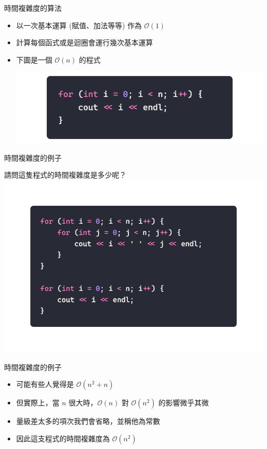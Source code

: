 \documentclass[aspectratio=169]{beamer}
\begin{document}
	\begin{frame}{時間複雜度的算法}
		\begin{itemize}
			\item<1-> 以一次基本運算 (賦值、加法等等) 作為 $\mathcal{O}(1)$
			\item<2-> 計算每個函式或是迴圈會運行幾次基本運算
			\item<3-> 下圖是一個 $\mathcal{O}(n)$ 的程式
			\begin{center}
				\includegraphics[width=1.0\textwidth]{./src/O(n)_1.png}
			\end{center}
		\end{itemize}


	\end{frame}

	\begin{frame}{時間複雜度的例子}
		\begin{center}
			請問這隻程式的時間複雜度是多少呢？
			\includegraphics[height=0.9\textheight]{./src/O(n^2)_1.png}
		\end{center}
	\end{frame}

	\begin{frame}{時間複雜度的例子}
		\begin{itemize}
			\item<1-> 可能有些人覺得是 $\mathcal{O}(n^2+n)$
			\item<2-> 但實際上，當 $n$ 很大時，$\mathcal{O}(n)$ 對 $\mathcal{O}(n^2)$ 的影響微乎其微
			\item<3-> 量級差太多的項次我們會省略，並稱他為常數
			\item<4-> 因此這支程式的時間複雜度為 $\mathcal{O}(n^2)$
		\end{itemize}
	\end{frame}
\end{document}

